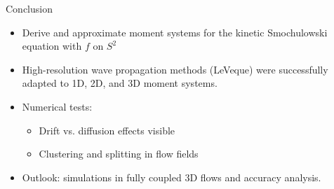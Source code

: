     \begin{frame}{Conclusion}
     \begin{itemize}
     	\item Derive and approximate moment systems for the kinetic Smochulowski equation with $f$ on $S^2$
     	\item High-resolution wave propagation methods (LeVeque) were successfully adapted to 1D, 2D, and 3D moment systems.
     	  \item Numerical tests:
     	\begin{itemize}
     		\item Drift vs. diffusion effects visible
     		\item Clustering and splitting in flow fields
     	\end{itemize}
     	\item Outlook: simulations in fully coupled 3D flows and accuracy analysis.
     \end{itemize}
    \end{frame}

